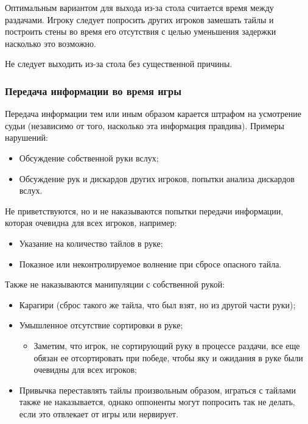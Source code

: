 Оптимальным вариантом для выхода из-за стола считается время между раздачами. Игроку следует попросить других игроков замешать тайлы и построить стены во время его отсутствия с целью уменьшения задержки насколько это возможно.

Не следует выходить из-за стола без существенной причины.


\subsubsection{Передача информации во время игры}

Передача информации тем или иным образом карается штрафом на усмотрение судьи (независимо от того, насколько эта информация правдива). Примеры нарушений:
\begin{itemize}
	\item Обсуждение собственной руки вслух;
	\item Обсуждение рук и дискардов других игроков, попытки анализа дискардов вслух.
\end{itemize}

Не приветствуются, но и не наказываются попытки передачи информации, которая очевидна для всех игроков, например:
\begin{itemize}
	\item Указание на количество тайлов в руке;
	\item Показное или неконтролируемое волнение при сбросе опасного тайла.
\end{itemize}

Также не наказываются манипуляции с собственной рукой:
\begin{itemize}
	\item Карагири (сброс такого же тайла, что был взят, но из другой части руки);
	\item Умышленное отсутствие сортировки в руке;
	\begin{itemize}
		\item Заметим, что игрок, не сортирующий руку в процессе раздачи, все еще обязан ее отсортировать при победе, чтобы яку и ожидания в руке были очевидны для всех игроков;
	\end{itemize}
	\item Привычка переставлять тайлы произвольным образом, играться с тайлами также не наказывается, однако оппоненты могут попросить так не делать, если это отвлекает от игры или нервирует.
\end{itemize}

